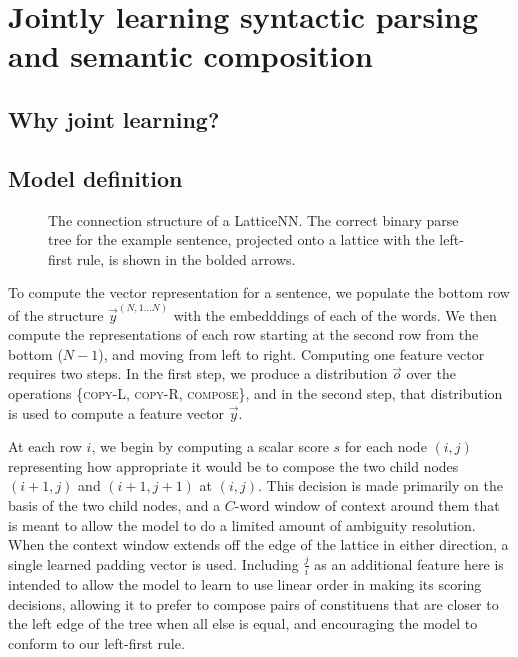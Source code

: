 \section{Jointly learning syntactic parsing and semantic composition}

\subsection{Why joint learning?}




\subsection{Model definition}

\begin{figure}[tp]
  \centering\small
 	

        \caption{The connection structure of a LatticeNN. The correct binary parse tree for the example sentence, projected onto a lattice with the left-first rule, is shown in the bolded arrows.}
  \label{lattice-fig1}
\end{figure}

To compute the vector representation for a sentence, we populate the bottom row of the structure $\vec{y}^{(N,1...N)}$ with the embedddings of each of the words. We then compute the representations of each row starting at the second row from the bottom ($N - 1$), and moving from left to right. Computing one feature vector requires two steps. In the first step, we produce a distribution $\vec{o}$ over the operations \{\textsc{copy-L, copy-R, compose}\}, and in the second step, that distribution is used to compute a feature vector $\vec{y}$.

At each row $i$, we begin by computing a scalar score $s$ for each node $(i, j)$ representing how appropriate it would be to compose the two child nodes $(i+1, j)$ and $(i+1, j+1)$ at $(i, j)$. This decision is made primarily on the basis of the two child nodes, and a $C$-word window of context around them that is meant to allow the model to do a limited amount of ambiguity resolution. When the context window extends off the edge of the lattice in either direction, a single learned padding vector is used. %
Including $\frac{j}{i}$ as an additional feature here is intended to allow the model to learn to use linear order in making its scoring decisions, allowing it to prefer to compose pairs of constituens that are closer to the left edge of the tree when all else is equal, and encouraging the model to conform to our left-first rule.

